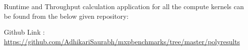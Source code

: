   Runtime and Throughput calculation application for all the compute kernels can be found from the below given repository:
  
  
  
  
  Github Link : \url{https://github.com/AdhikariSaurabh/mxpbenchmarks/tree/master/polyresults}
  
 
   
%  
% 
%    
%
%
    
    
    


